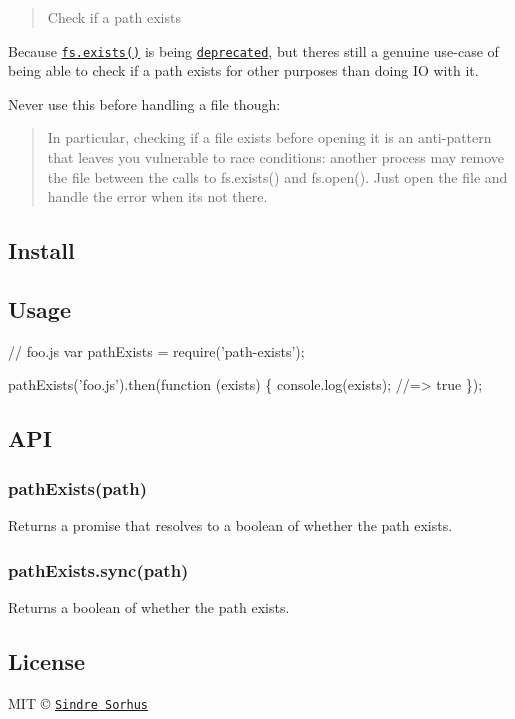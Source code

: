 \begin{quote}
Check if a path exists \end{quote}


Because \href{https://nodejs.org/api/fs.html#fs_fs_exists_path_callback}{\tt {\ttfamily fs.\+exists()}} is being \href{https://github.com/iojs/io.js/issues/103}{\tt deprecated}, but there\textquotesingle{}s still a genuine use-\/case of being able to check if a path exists for other purposes than doing IO with it.

Never use this before handling a file though\+:

\begin{quote}
In particular, checking if a file exists before opening it is an anti-\/pattern that leaves you vulnerable to race conditions\+: another process may remove the file between the calls to {\ttfamily fs.\+exists()} and {\ttfamily fs.\+open()}. Just open the file and handle the error when it\textquotesingle{}s not there. \end{quote}


\subsection*{Install}




\subsection*{Usage}


\begin{DoxyCode}
// foo.js
var pathExists = require('path-exists');

pathExists('foo.js').then(function (exists) \{
    console.log(exists);
    //=> true
\});
\end{DoxyCode}


\subsection*{A\+PI}

\subsubsection*{path\+Exists(path)}

Returns a promise that resolves to a boolean of whether the path exists.

\subsubsection*{path\+Exists.\+sync(path)}

Returns a boolean of whether the path exists.

\subsection*{License}

M\+IT © \href{http://sindresorhus.com}{\tt Sindre Sorhus} 